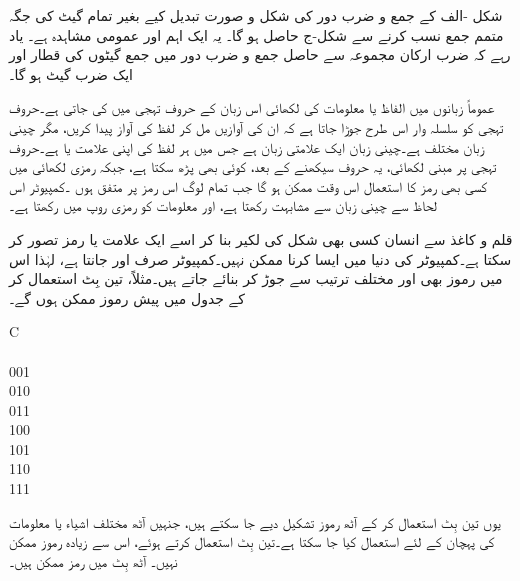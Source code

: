 شکل -الف کے جمع و ضرب دور کی شکل و صورت تبدیل کیے بغیر تمام گیٹ کی جگہ متمم جمع نسب کرنے سے شکل-ج حاصل ہو گا۔ یہ ایک اہم اور عمومی مشاہدہ ہے۔ یاد رہے کہ ضرب ارکان مجموعہ سے حاصل جمع و ضرب دور میں جمع گیٹوں کی قطار اور ایک ضرب گیٹ ہو گا۔



عموماً زبانوں میں الفاظ یا معلومات کی لکھائی اس زبان کے حروف تہجی میں کی جاتی ہے۔حروف تہجی کو سلسلہ وار اس طرح جوڑا جاتا ہے کہ ان کی آوازیں مل کر لفظ کی آواز پیدا کریں، مگر چینی زبان مختلف ہے۔چینی زبان ایک علامتی زبان ہے جس میں ہر لفظ کی اپنی علامت یا  ہے۔حروف تہجی پر مبنی لکھائی، یہ حروف سیکھنے کے بعد، کوئی بھی پڑھ سکتا ہے، جبکہ رمزی لکھائی میں کسی بھی رمز کا استعمال اس وقت ممکن ہو گا جب تمام لوگ اس رمز پر متفق ہوں ۔کمپیوٹر اس لحاظ سے چینی زبان سے مشابہت رکھتا ہے، اور معلومات کو رمزی روپ میں رکھتا ہے۔ 

قلم و کاغذ سے انسان کسی بھی شکل کی لکیر بنا کر اسے ایک علامت یا رمز تصور کر سکتا ہے۔کمپیوٹر کی دنیا میں ایسا کرنا ممکن نہیں۔کمپیوٹر صرف  اور  جانتا ہے، لہٰذا اس میں رموز بھی  اور  مختلف ترتیب سے جوڑ کر بنائے جاتے ہیں۔مثلاً، تین بِٹ استعمال کر کے جدول  میں پیش رموز ممکن ہوں گے۔
\begin{table}
\caption{تین بِٹ رموز۔}
\label{جدول_بوولین_تین_بٹ_رموز}
\centering
\begin{otherlanguage}{english}
\begin{tabular}{C}
\toprule
{}\\
\\
001\\
010\\
011\\
100\\
101\\
110\\
111\\
\bottomrule
\end{tabular}
\end{otherlanguage}
\end{table}
یوں تین بِٹ استعمال کر کے آٹھ رموز تشکیل دیے جا سکتے ہیں، جنہیں آٹھ مختلف اشیاء یا معلومات کی پہچان کے لئے استعمال کیا جا سکتا ہے۔تین بِٹ استعمال کرتے ہوئے، اس سے زیادہ رموز ممکن نہیں۔ آٹھ بِٹ میں  رمز ممکن ہیں۔

